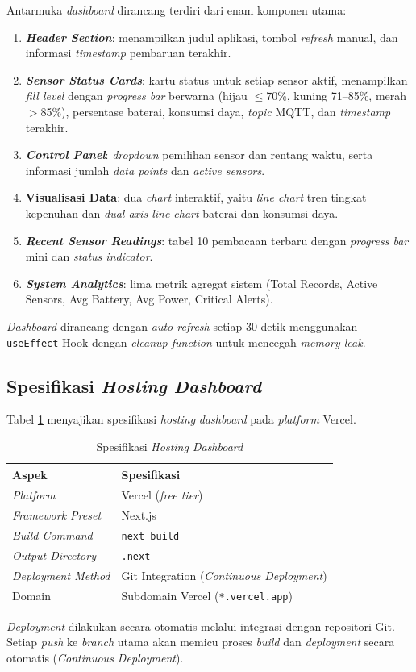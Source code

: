 Antarmuka \textit{dashboard} dirancang terdiri dari enam komponen utama:

\begin{enumerate}
  \item \textbf{\textit{Header Section}}: menampilkan judul aplikasi, tombol \textit{refresh} manual, dan informasi \textit{timestamp} pembaruan terakhir.
  \item \textbf{\textit{Sensor Status Cards}}: kartu status untuk setiap sensor aktif, menampilkan \textit{fill level} dengan \textit{progress bar} berwarna (hijau $\leq$70\%, kuning 71--85\%, merah $>$85\%), persentase baterai, konsumsi daya, \textit{topic} MQTT, dan \textit{timestamp} terakhir.
  \item \textbf{\textit{Control Panel}}: \textit{dropdown} pemilihan sensor dan rentang waktu, serta informasi jumlah \textit{data points} dan \textit{active sensors}.
  \item \textbf{Visualisasi Data}: dua \textit{chart} interaktif, yaitu \textit{line chart} tren tingkat kepenuhan dan \textit{dual-axis line chart} baterai dan konsumsi daya.
  \item \textbf{\textit{Recent Sensor Readings}}: tabel 10 pembacaan terbaru dengan \textit{progress bar} mini dan \textit{status indicator}.
  \item \textbf{\textit{System Analytics}}: lima metrik agregat sistem (Total Records, Active Sensors, Avg Battery, Avg Power, Critical Alerts).
\end{enumerate}

\textit{Dashboard} dirancang dengan \textit{auto-refresh} setiap 30 detik menggunakan \texttt{useEffect} Hook dengan \textit{cleanup function} untuk mencegah \textit{memory leak}.

\subsection{Spesifikasi \textit{Hosting Dashboard}}

Tabel \ref{tab:hosting-dashboard} menyajikan spesifikasi \textit{hosting} \textit{dashboard} pada \textit{platform} Vercel.

\begin{table}[H]
  \caption{Spesifikasi \textit{Hosting Dashboard}}
  \label{tab:hosting-dashboard}
  \begin{tabularx}{\textwidth}{| l | X |}
    \hline
    \textbf{Aspek} & \textbf{Spesifikasi} \\
    \hline
    \textit{Platform} & Vercel (\textit{free tier}) \\
    \hline
    \textit{Framework Preset} & Next.js \\
    \hline
    \textit{Build Command} & \texttt{next build} \\
    \hline
    \textit{Output Directory} & \texttt{.next} \\
    \hline
    \textit{Deployment Method} & Git Integration (\textit{Continuous Deployment}) \\
    \hline
    Domain & Subdomain Vercel (\texttt{*.vercel.app}) \\
    \hline
  \end{tabularx}
\end{table}

\textit{Deployment} dilakukan secara otomatis melalui integrasi dengan repositori Git. Setiap \textit{push} ke \textit{branch} utama akan memicu proses \textit{build} dan \textit{deployment} secara otomatis (\textit{Continuous Deployment}).